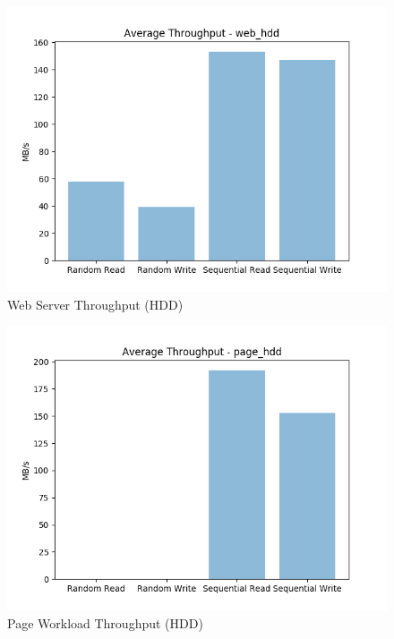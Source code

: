\documentclass[10pt, author, twocolumn]{article}
\begin{document}
\begin{figure}[h!]
    \includegraphics[scale=0.5]{../graphs/web_hdd-thru.png}
    \caption{Web Server Throughput (HDD)}
    \label{fig:hdd_web_thru}
\end{figure}

\vspace{5cm}
\begin{figure}[h!]
    \includegraphics[scale=0.5]{../graphs/page_hdd-thru.png}
    \caption{Page Workload Throughput (HDD)}
    \label{fig:hdd_page_thru}
\end{figure}
\end{document}
